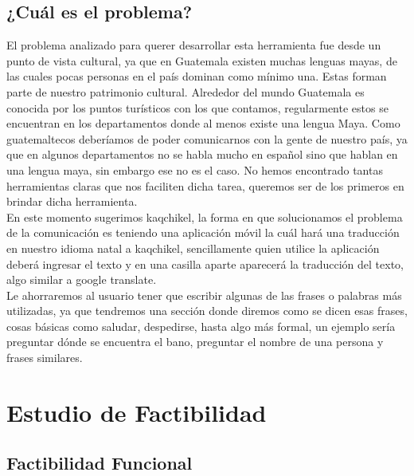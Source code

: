 \documentclass[a4paper,openright,12pt]{article}
\begin{document}
\subsection{¿Cuál es el problema?}
El problema analizado para querer desarrollar esta herramienta fue desde un punto de vista cultural, ya que en Guatemala existen muchas lenguas mayas, de las cuales pocas personas en el pa\'is dominan como m\'inimo una. Estas forman parte de nuestro patrimonio cultural. Alrededor del mundo Guatemala es conocida por los puntos tur\'isticos con los que contamos, regularmente estos se encuentran en los departamentos donde al menos existe una lengua Maya.  Como guatemaltecos deber\'iamos de poder comunicarnos con la gente de nuestro pa\'is, ya que en algunos departamentos no se habla mucho en espa\~nol sino que hablan en una lengua maya, sin embargo ese no es el caso. No hemos encontrado tantas herramientas claras que nos faciliten dicha tarea, queremos ser de los primeros en brindar dicha herramienta.\\

En este momento sugerimos kaqchikel, la forma en que solucionamos el problema de la comunicación es teniendo una aplicación m\'ovil la cu\'al har\'a una traducción en nuestro idioma natal a kaqchikel, sencillamente quien utilice la aplicación deberá ingresar el texto y en una casilla aparte aparecer\'a la traducci\'on del texto, algo similar a google translate.\\

Le ahorraremos al usuario tener que escribir algunas de las frases o palabras m\'as utilizadas, ya que tendremos una secci\'on donde diremos como se dicen esas frases, cosas b\'asicas como saludar, despedirse, hasta algo m\'as formal, un ejemplo ser\'ia preguntar d\'onde se encuentra el bano, preguntar el nombre de una persona y frases similares.\\
\newpage

\section{Estudio de Factibilidad}
\subsection{Factibilidad Funcional}
\end{document}
